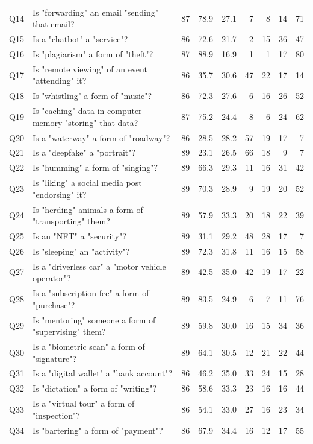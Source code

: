 \begin{scriptsize}
\begin{longtable}{lp{}rrrrrrr}
Q14 & Is "forwarding" an email "sending" that email? & 87 & 78.9 & 27.1 & 7 & 8 & 14 & 71 \\
Q15 & Is a "chatbot" a "service"? & 86 & 72.6 & 21.7 & 2 & 15 & 36 & 47 \\
Q16 & Is "plagiarism" a form of "theft"? & 87 & 88.9 & 16.9 & 1 & 1 & 17 & 80 \\
Q17 & Is "remote viewing" of an event "attending" it? & 86 & 35.7 & 30.6 & 47 & 22 & 17 & 14 \\
Q18 & Is "whistling" a form of "music"? & 86 & 72.3 & 27.6 & 6 & 16 & 26 & 52 \\
Q19 & Is "caching" data in computer memory "storing" that data? & 87 & 75.2 & 24.4 & 8 & 6 & 24 & 62 \\
Q20 & Is a "waterway" a form of "roadway"? & 86 & 28.5 & 28.2 & 57 & 19 & 17 & 7 \\
Q21 & Is a "deepfake" a "portrait"? & 89 & 23.1 & 26.5 & 66 & 18 & 9 & 7 \\
Q22 & Is "humming" a form of "singing"? & 89 & 66.3 & 29.3 & 11 & 16 & 31 & 42 \\
Q23 & Is "liking" a social media post "endorsing" it? & 89 & 70.3 & 28.9 & 9 & 19 & 20 & 52 \\
Q24 & Is "herding" animals a form of "transporting" them? & 89 & 57.9 & 33.3 & 20 & 18 & 22 & 39 \\
Q25 & Is an "NFT" a "security"? & 89 & 31.1 & 29.2 & 48 & 28 & 17 & 7 \\
Q26 & Is "sleeping" an "activity"? & 89 & 72.3 & 31.8 & 11 & 16 & 15 & 58 \\
Q27 & Is a "driverless car" a "motor vehicle operator"? & 89 & 42.5 & 35.0 & 42 & 19 & 17 & 22 \\
Q28 & Is a "subscription fee" a form of "purchase"? & 89 & 83.5 & 24.9 & 6 & 7 & 11 & 76 \\
Q29 & Is "mentoring" someone a form of "supervising" them? & 89 & 59.8 & 30.0 & 16 & 15 & 34 & 36 \\
Q30 & Is a "biometric scan" a form of "signature"? & 89 & 64.1 & 30.5 & 12 & 21 & 22 & 44 \\
Q31 & Is a "digital wallet" a "bank account"? & 86 & 46.2 & 35.0 & 33 & 24 & 15 & 28 \\
Q32 & Is "dictation" a form of "writing"? & 86 & 58.6 & 33.3 & 23 & 16 & 16 & 44 \\
Q33 & Is a "virtual tour" a form of "inspection"? & 86 & 54.1 & 33.0 & 27 & 16 & 23 & 34 \\
Q34 & Is "bartering" a form of "payment"? & 86 & 67.9 & 34.4 & 16 & 12 & 17 & 55 \\

\end{longtable}
\end{scriptsize}
